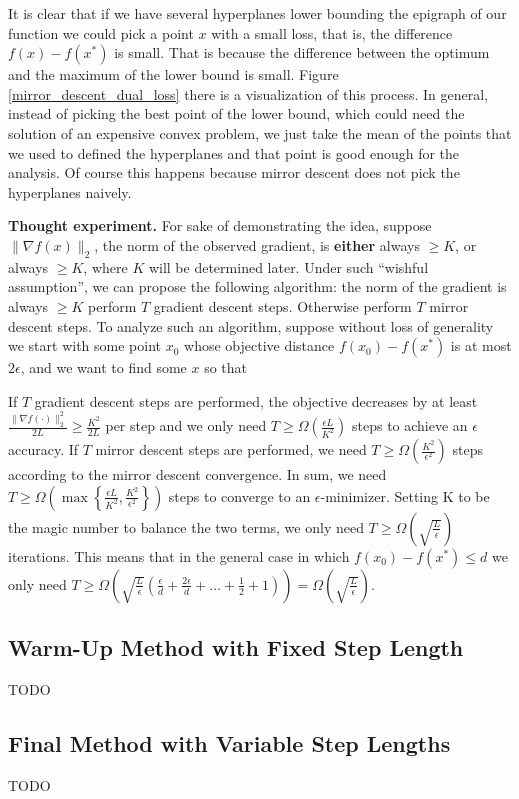It is clear that if we have several hyperplanes lower bounding the epigraph of our function we could pick a point $x$ with a small loss, that is, the difference $f(x)-f(x^\ast)$ is small. That is because the difference between the optimum and the maximum of the lower bound is small. Figure \ref{mirror_descent_dual_loss} there is a visualization of this process. In general, instead of picking the best point of the lower bound, which could need the solution of an expensive convex problem, we just take the mean of the points that we used to defined the hyperplanes and that point is good enough for the analysis. Of course this happens because mirror descent does not pick the hyperplanes naively.


\textbf{Thought experiment.} For sake of demonstrating the idea, suppose $\| \nabla f(x) \|_2$, the norm of the observed gradient, is \textbf{either} always $\geq K$, or always $\geq K$, where $K$ will be determined later. Under such ``wishful assumption'', we can propose the following algorithm: the norm of the gradient is always $\geq K$ perform $T$ gradient descent steps. Otherwise perform $T$ mirror descent steps. To analyze such an algorithm, suppose without loss of generality we start with some point $x_0$ whose objective distance $f(x_0 )-f(x^\ast )$ is at most $2\epsilon$, and we want to find some $x$ so that

If $T$ gradient descent steps are performed, the objective decreases by at least $\frac{\|\nabla f(\cdot)\|_2^2}{2L} \geq \frac{K^2}{2L}$ per step and we only need $T \geq \Omega\left(\frac{\epsilon L}{K^2}\right)$ steps to achieve an $\epsilon$ accuracy. If $T$ mirror descent steps are performed, we need $T \geq \Omega\left(\frac{K^2}{\epsilon^2}\right)$ steps according to the mirror descent convergence. In sum, we need $T \geq \Omega\left( \max \left\{ \frac{\epsilon L}{K^2}, \frac{K^2}{\epsilon^2}\right\}\right)$ steps to converge to an $\epsilon$-minimizer. Setting K to be the magic number to balance the two terms, we only need $T \geq \Omega\left( \sqrt{\frac{L}{\epsilon}}\right)$ iterations. This means that in the general case in which $f(x_0) - f(x^\ast) \leq d $ we only need $T \geq \Omega \left(\sqrt{\frac{L}{\epsilon}}\left(\frac{\epsilon}{d} + \frac{2\epsilon}{d} + \dots + \frac{1}{2} + 1 \right)\right) = \Omega \left( \sqrt{\frac{L}{\epsilon}}\right)$.

\subsection{Warm-Up Method with Fixed Step Length}
TODO

\subsection{Final Method with Variable Step Lengths}
TODO
